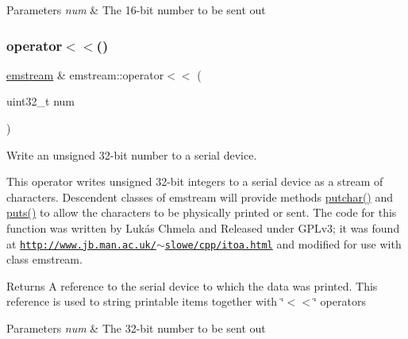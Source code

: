 \begin{DoxyParams}{Parameters}
{\em num} & The 16-\/bit number to be sent out \\
\hline
\end{DoxyParams}
\mbox{\label{classemstream_aa3915880211b615d4f889036683c53c3}} 
\subsubsection{\texorpdfstring{operator$<$$<$()}{operator<<()}\hspace{0.1cm}{\footnotesize\ttfamily [7/14]}}
{\footnotesize\ttfamily \mbox{\hyperlink{classemstream}{emstream}} \& emstream\+::operator$<$$<$ (\begin{DoxyParamCaption}\item[{uint32\+\_\+t}]{num }\end{DoxyParamCaption})}



Write an unsigned 32-\/bit number to a serial device. 

This operator writes unsigned 32-\/bit integers to a serial device as a stream of characters. Descendent classes of {\ttfamily emstream} will provide methods {\ttfamily \mbox{\hyperlink{classemstream_aa4dffc9aa58f601cc4153b4cbe65d757}{putchar()}}} and {\ttfamily \mbox{\hyperlink{classemstream_a1ad530cbebe6c54640c1db8c1b9afda2}{puts()}}} to allow the characters to be physically printed or sent. The code for this function was written by Lukás Chmela and Released under G\+P\+Lv3; it was found at \href{http://www.jb.man.ac.uk/~slowe/cpp/itoa.html}{\tt http\+://www.\+jb.\+man.\+ac.\+uk/$\sim$slowe/cpp/itoa.\+html} and modified for use with class {\ttfamily emstream}. \begin{DoxyReturn}{Returns}
A reference to the serial device to which the data was printed. This reference is used to string printable items together with \char`\"{}$<$$<$\char`\"{} operators 
\end{DoxyReturn}

\begin{DoxyParams}{Parameters}
{\em num} & The 32-\/bit number to be sent out \\
\hline
\end{DoxyParams}
\mbox{\label{classemstream_abf54c92665eaecae12af886b4275ded3}} 
